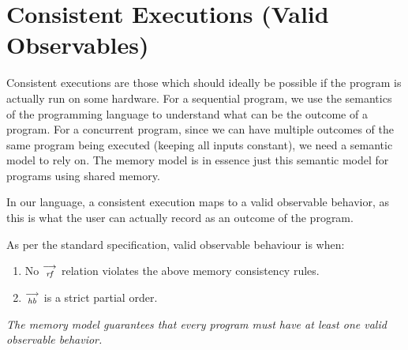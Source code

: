 

   \section{Consistent Executions (Valid Observables)}
      
      Consistent executions are those which should ideally be possible if the program is actually run on some hardware. 
      For a sequential program, we use the semantics of the programming language to understand what can be the outcome of a program. 
      For a concurrent program, since we can have multiple outcomes of the same program being executed (keeping all inputs constant), we need a semantic model to rely on. 
      The memory model is in essence just this semantic model for programs using shared memory.
      
      In our language, a consistent execution maps to a valid observable behavior, as this is what the user can actually record as an outcome of the program. 
   
      As per the standard specification, valid observable behaviour is when\footnotemark:
        \begin{enumerate}
           \item No $\stackrel{\longrightarrow}{_\textit{rf}}$ relation violates the above memory consistency rules.
           \item $\stackrel{\longrightarrow}{_\textit{hb}}$ is a strict partial order.
        \end{enumerate} 

        \textit{The memory model guarantees that every program must have at least one valid observable behavior.}

    